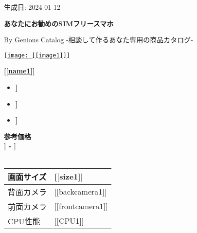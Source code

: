 \documentclass[lualatex,paper=a4,airticle]{jlreq}
\begin{document}
\begin{flushright}
生成日: 2024-01-12
\end{flushright}
\begin{center}
{\huge\textbf{あなたにお勧めのSIMフリースマホ}}\par
By Genious Catalog  -相談して作るあなた専用の商品カタログ-
\end{center}

\noindent
\begin{minipage}[t][0.43\textheight][t]{\textwidth}
\begin{minipage}{0.23\textwidth}
\href{[[url1]]}{
\texttt{[image: [[image1]]]} %
}
\end{minipage}%
\hfill
\begin{minipage}{0.77\textwidth}
\href{[[url1]]}{\huge{\textbf{[[name1]]}}}\par
\begin{itemize}
\item {\color{Purple}\mcfamily\bfseries\myfont [[description11]]}
\item {\color{Purple}\mcfamily\bfseries\myfont [[description12]]}
\item {\color{Purple}\mcfamily\bfseries\myfont [[description13]]}
\end{itemize}
\end{minipage}
\vspace{-1\baselineskip}
\begin{multicols}{2}
{\color{red}\textbf{参考価格}}\\
{\LARGE\color{red}\textbf{\textyen [[lprice1]] - \textyen [[hprice1]]}}\\
\\
  \begin{minipage}{0.75\columnwidth}
  \begin{tabular}{l p{4.5cm}}
  \hline
  画面サイズ & [[size1]] \\
  \hline
  背面カメラ & [[backcamera1]] \\
  \hline
  前面カメラ & [[frontcamera1]] \\
  \hline
  CPU性能 & [[CPU1]] \\
  \hline
  \end{tabular}
  \end{minipage}
\columnbreak


\end{multicols}
\end{minipage}
\end{document}
